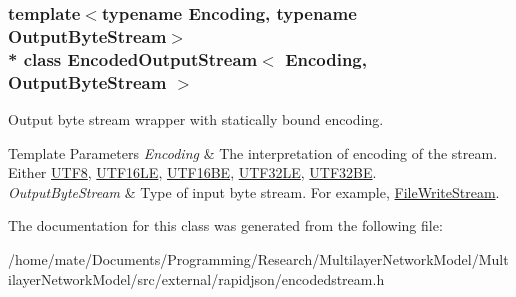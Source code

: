 \subsubsection*{template$<$typename Encoding, typename Output\+Byte\+Stream$>$\\*
class Encoded\+Output\+Stream$<$ Encoding, Output\+Byte\+Stream $>$}

Output byte stream wrapper with statically bound encoding. 


\begin{DoxyTemplParams}{Template Parameters}
{\em Encoding} & The interpretation of encoding of the stream. Either \hyperlink{structUTF8}{U\+T\+F8}, \hyperlink{structUTF16LE}{U\+T\+F16\+LE}, \hyperlink{structUTF16BE}{U\+T\+F16\+BE}, \hyperlink{structUTF32LE}{U\+T\+F32\+LE}, \hyperlink{structUTF32BE}{U\+T\+F32\+BE}. \\
\hline
{\em Output\+Byte\+Stream} & Type of input byte stream. For example, \hyperlink{classFileWriteStream}{File\+Write\+Stream}. \\
\hline
\end{DoxyTemplParams}


The documentation for this class was generated from the following file\+:\begin{DoxyCompactItemize}
\item 
/home/mate/\+Documents/\+Programming/\+Research/\+Multilayer\+Network\+Model/\+Multilayer\+Network\+Model/src/external/rapidjson/encodedstream.\+h\end{DoxyCompactItemize}
